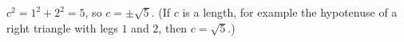 $c^2=1^2+2^2=5$, so $\boxed{c=\pm\sqrt5}$. (If $c$ is a length, for example the hypotenuse of a right triangle with legs $1$ and $2$, then $c=\sqrt5$.)
